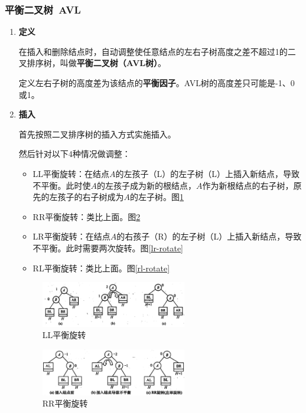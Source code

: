 \documentclass[12pt, a4paper, oneside]{ctexart}
\begin{document}
\subsubsection{平衡二叉树\ AVL}

\begin{enumerate}
  \item {\bf 定义}
  
  在插入和删除结点时，自动调整使任意结点的左右子树高度之差不超过1的二叉排序树，叫做\textbf{平衡二叉树（AVL树）}。

  定义左右子树的高度差为该结点的\textbf{平衡因子}。AVL树的高度差只可能是-1、0或1。

  \item {\bf 插入}
  
  首先按照二叉排序树的插入方式实施插入。

  然后针对以下4种情况做调整：
  \begin{itemize}
    \item LL平衡旋转：在结点$A$的左孩子（L）的左子树（L）上插入新结点，导致不平衡。此时使$A$的左孩子成为新的根结点，$A$作为新根结点的右子树，原先的左孩子的右子树成为$A$的左子树。图\ref{ll-rotate}
    \item RR平衡旋转：类比上面。图\ref{rr-rotate}
    \item LR平衡旋转：在结点$A$的右孩子（R）的左子树（L）上插入新结点，导致不平衡。此时需要两次旋转。图\ref{lr-rotate}
    \item RL平衡旋转：类比上面。图\ref{rl-rotate}
  \end{itemize}

  \begin{figure}
    \centering
    \includegraphics[width=0.6\textwidth]{./images/ll-rotate.png}
    \caption{LL平衡旋转}
    \label{ll-rotate}
  \end{figure}

  \begin{figure}
    \centering
    \includegraphics[width=0.6\textwidth]{./images/rr-rotate.png}
    \caption{RR平衡旋转}
    \label{rr-rotate}
  \end{figure}


\end{enumerate}
\end{document}
